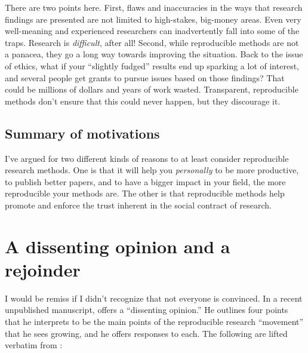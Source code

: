 \documentclass{book}
\begin{document}
There are two points here. First, flaws and inaccuracies in the ways that research findings are presented are not limited to high-stakes, big-money areas. Even very well-meaning and experienced researchers can inadvertently fall into some of the traps. Research is \emph{difficult}, after all!  Second, while reproducible methods are not a panacea, they go a long way towards improving the situation. Back to the issue of ethics, what if your ``slightly fudged'' results end up sparking a lot of interest, and several people get grants to pursue issues based on those findings? That could be millions of dollars and years of work wasted.  Transparent, reproducible methods don't ensure that this could never happen, but they discourage it.
\subsection{Summary of motivations}
\label{sec-2-3-3}

I've argued for two different kinds of reasons to at least consider reproducible research methods. One is that it will help you \emph{personally} to be more productive, to publish better papers, and to have a bigger impact in your field, the more reproducible your methods are. The other is that reproducible methods help promote and enforce the trust inherent in the social contract of research.  
\section{A dissenting opinion and a rejoinder}
\label{sec-2-4}
\label{dissenting}

I would be remiss if I didn't recognize that not everyone is convinced. In a recent unpublished manuscript, \textcite{drummond2012reproducible} offers a ``dissenting opinion.'' He outlines four points that he interprets to be the main points of the reproducible research ``movement'' that he sees growing, and he offers responses to each. The following are lifted verbatim from \textcite[][p.2--3]{drummond2012reproducible}:
\end{document}
